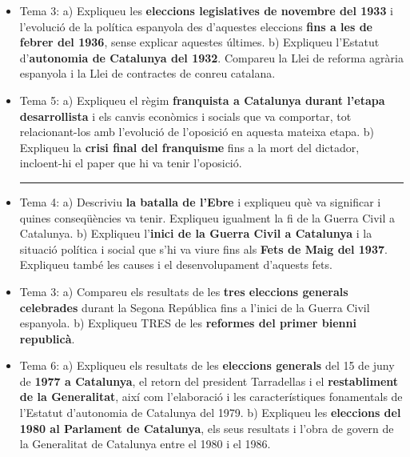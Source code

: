 \documentclass[arial,a4paper,print]{article}
\begin{document}
\begin{itemize}
\item Tema 3:
\subitem a) Expliqueu les \textbf{eleccions legislatives de novembre del 1933} i l’evolució de la política espanyola des d’aquestes eleccions \textbf{fins a les de febrer del 1936}, sense explicar aquestes últimes.
\subitem b) Expliqueu  l’Estatut  d’\textbf{autonomia  de  Catalunya  del  1932}.  Compareu  la  Llei  de  reforma  agrària espanyola i la Llei de contractes de conreu catalana.

\item Tema 5:
\subitem a) Expliqueu el règim \textbf{franquista a Catalunya durant l’etapa desarrollista} i els canvis econòmics i socials que va comportar, tot relacionant-los amb l’evolució de l’oposició en aquesta mateixa etapa.
\subitem b) Expliqueu la \textbf{crisi final del franquisme} fins a la mort del dictador, incloent-hi el paper que hi va tenir l’oposició.

\noindent\rule{\linewidth}{0.4pt}

\item Tema 4:
\subitem a) Descriviu \textbf{la batalla de l’Ebre} i expliqueu què va significar i quines conseqüències va tenir. Expliqueu igualment la fi de la Guerra Civil a Catalunya.
\subitem b) Expliqueu  l’\textbf{inici  de  la  Guerra  Civil  a  Catalunya}  i  la  situació  política  i  social  que  s’hi  va  viure  fins  als  \textbf{Fets  de  Maig  del  1937}.  Expliqueu  també  les  causes  i  el  desenvolupament  d’aquests fets.

\item Tema 3: 
\subitem a) Compareu els resultats de les \textbf{tres eleccions generals celebrades} durant la Segona República fins a l’inici de la Guerra Civil espanyola.
\subitem b) Expliqueu TRES de les \textbf{reformes del primer bienni republicà}.

\item Tema 6:
\subitem a) Expliqueu  els  resultats  de  les  \textbf{eleccions  generals}  del  15  de  juny  de  \textbf{1977 a Catalunya},  el  retorn del president Tarradellas i el \textbf{restabliment de la Generalitat}, així com l’elaboració i les característiques fonamentals de l’Estatut d’autonomia de Catalunya del 1979.
\subitem b) Expliqueu les \textbf{eleccions del 1980 al Parlament de Catalunya}, els seus resultats i l’obra de govern de la Generalitat de Catalunya entre el 1980 i el 1986.

\end{itemize}


	
\end{document}
